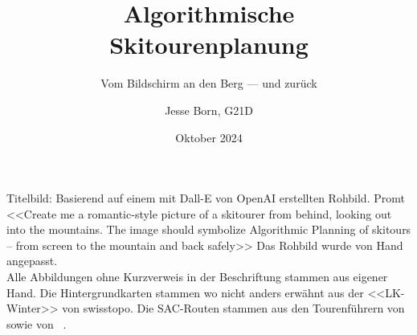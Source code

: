 \documentclass[a4paper, listof=numbered]{scrarticle}
\title{\AKAfont\Huge\textcolor{AKSAcolor}{Algorithmische\\Skitourenplanung}}
\subtitle{Vom Bildschirm an den Berg --- und zurück}
\author{Jesse Born, G21D}
\date{Oktober 2024}
\begin{document}

\maketitle
{}
\tableofcontents

% 






\clearpage


\printbibliography[heading=bibnumbered]
\clearpage

\appendix
{}
\printglossary[type=\acronymtype, title={Abkürzungsverzeichnis}, nonumberlist]
\clearpage
\listoffigures


Titelbild: Basierend auf einem mit Dall-E von OpenAI erstellten Rohbild. Promt <<Create me a romantic-style picture of a skitourer from behind, looking out into the mountains. The image should symbolize Algorithmic Planning of skitours -- from screen to the mountain and back safely>> Das Rohbild wurde von Hand angepasst.\\

Alle Abbildungen ohne Kurzverweis in der Beschriftung stammen aus eigener Hand. Die Hintergrundkarten stammen wo nicht anders erwähnt aus der <<LK-Winter>> von swisstopo. Die SAC-Routen stammen aus den Tourenführern  von   \citeauthor{mmzentralch} sowie  von \citeauthor{twslstgallappzll}~\cite{mmzentralch}\cite{twslstgallappzll}.
\clearpage

\end{document}
